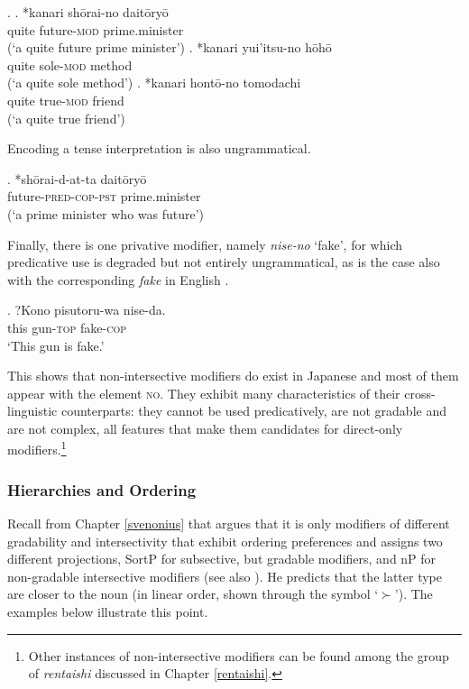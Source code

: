 \documentclass [output=book,colorlinks,citecolor=brown]{langscibook}
\begin{document}

\ex. \ag. *kanari shōrai-no daitōryō\\
quite future-\textsc{mod} prime.minister\\
(`a quite future prime minister’)
\bg. *kanari yui'itsu-no hōhō\\
quite sole-\textsc{mod} method\\
(`a quite sole method’)
\cg. *kanari hontō-no tomodachi\\
quite true-\textsc{mod} friend\\
(`a quite true friend’)

Encoding a tense interpretation is also ungrammatical. %

\exg. *shōrai-d-at-ta daitōryō\\
future-\textsc{pred-cop-pst} prime.minister\\
(`a prime minister who was future’)

Finally, there is one privative modifier, namely \textit{nise-no} `fake’, for which predicative use is degraded but not entirely ungrammatical, as is the case also with the corresponding \textit{fake} in English \citep{cinque:2014:semantics}.

\exg. ?Kono pisutoru-wa nise-da.\\
this gun-\textsc{top} fake-\textsc{cop}\\
`This gun is fake.'

This shows that non-intersective modifiers do exist in Japanese and most of them appear with the element \textsc{no}. They exhibit many characteristics of their cross-linguistic counterparts: they cannot be used predicatively, are not gradable and are not complex, all features that make them candidates for direct-only modifiers.\footnote{Other instances of non-intersective modifiers can be found among the group of \textit{rentaishi} discussed in Chapter \ref{rentaishi}.}

\subsubsection{Hierarchies and Ordering} \label{ordering intersective}

Recall from Chapter \ref{svenonius} that \citet{svenonius:2008:position} argues that it is only modifiers of different gradability and intersectivity that exhibit ordering preferences and assigns two different projections, SortP for subsective, but gradable modifiers, and nP for non-gradable intersective modifiers (see also \citealt{dekany:2011:profile, truswell:2009:attributive, kim:2019:syntax}). He predicts that the latter type are closer to the noun (in linear order, shown through the symbol `$\succ$'). The examples below illustrate this point. %
\end{document}
